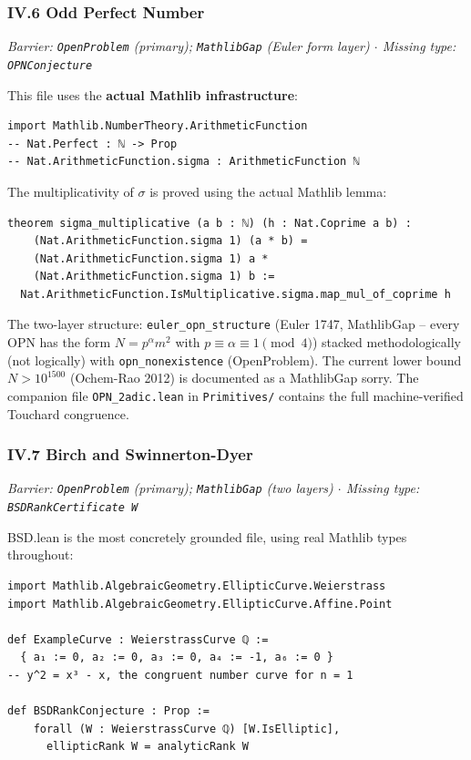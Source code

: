 \documentclass[12pt,a4paper]{article}
\begin{document}
\subsubsection{IV.6 Odd Perfect Number}

\emph{Barrier: \texttt{OpenProblem} (primary); \texttt{MathlibGap} (Euler form layer) $\cdot$ Missing type: \texttt{OPNConjecture}}

This file uses the \textbf{actual Mathlib infrastructure}:

\begin{lstlisting}[language=lean]
import Mathlib.NumberTheory.ArithmeticFunction
-- Nat.Perfect : ℕ -> Prop
-- Nat.ArithmeticFunction.sigma : ArithmeticFunction ℕ
\end{lstlisting}

The multiplicativity of $\sigma$ is proved using the actual Mathlib lemma:

\begin{lstlisting}[language=lean]
theorem sigma_multiplicative (a b : ℕ) (h : Nat.Coprime a b) :
    (Nat.ArithmeticFunction.sigma 1) (a * b) =
    (Nat.ArithmeticFunction.sigma 1) a *
    (Nat.ArithmeticFunction.sigma 1) b :=
  Nat.ArithmeticFunction.IsMultiplicative.sigma.map_mul_of_coprime h
\end{lstlisting}

The two-layer structure: \texttt{euler\_opn\_structure} (Euler 1747, MathlibGap  --  every OPN has the form $N = p^\alpha m^2$ with $p \equiv \alpha \equiv 1 \pmod 4$) stacked methodologically (not logically) with \texttt{opn\_nonexistence} (OpenProblem). The current lower bound $N > 10^{1500}$ (Ochem-Rao 2012) is documented as a MathlibGap sorry. The companion file \texttt{OPN\_2adic.lean} in \texttt{Primitives/} contains the full machine-verified Touchard congruence.

\subsubsection{IV.7 Birch and Swinnerton-Dyer}

\emph{Barrier: \texttt{OpenProblem} (primary); \texttt{MathlibGap} (two layers) $\cdot$ Missing type: \texttt{BSDRankCertificate W}}

BSD.lean is the most concretely grounded file, using real Mathlib types throughout:

\begin{lstlisting}[language=lean]
import Mathlib.AlgebraicGeometry.EllipticCurve.Weierstrass
import Mathlib.AlgebraicGeometry.EllipticCurve.Affine.Point

def ExampleCurve : WeierstrassCurve ℚ :=
  { a₁ := 0, a₂ := 0, a₃ := 0, a₄ := -1, a₆ := 0 }
-- y^2 = x³ - x, the congruent number curve for n = 1

def BSDRankConjecture : Prop :=
    forall (W : WeierstrassCurve ℚ) [W.IsElliptic],
      ellipticRank W = analyticRank W
\end{lstlisting}
\end{document}
